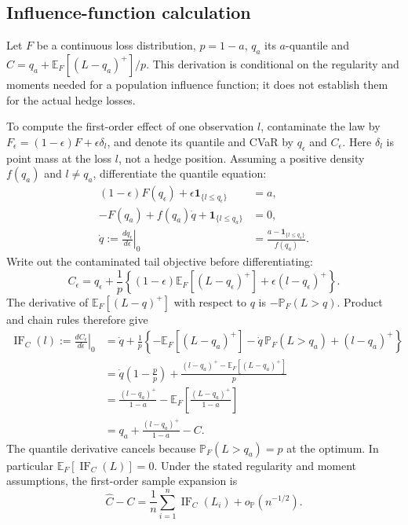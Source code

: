 \documentclass[11pt,a4paper]{article}
\newcommand{\E}{\mathbb E}
\newcommand{\Pp}{\mathbb P}
\newcommand{\ind}{\mathbf 1}
\newcommand{\IF}{\operatorname{IF}}
\theoremstyle{remark}
\begin{document}
\subsection{Influence-function calculation}
Let $F$ be a continuous loss distribution, $p=1-a$, $q_a$ its $a$-quantile and
$C=q_a+\E_F[(L-q_a)^+]/p$. This derivation is conditional on the regularity and moments needed for a population influence function; it does not establish them for the actual hedge losses.

To compute the first-order effect of one observation $l$, contaminate the law by
$F_\epsilon=(1-\epsilon)F+\epsilon\delta_l$, and denote its quantile and CVaR by $q_\epsilon$ and $C_\epsilon$. Here $\delta_l$ is point mass at the loss $l$, not a hedge position. Assuming a positive density $f(q_a)$ and $l\ne q_a$, differentiate the quantile equation:
\begin{align}
 (1-\epsilon)F(q_\epsilon)+\epsilon\ind_{\{l\leq q_\epsilon\}}&=a,\nonumber\\
 -F(q_a)+f(q_a)\dot q+\ind_{\{l\leq q_a\}}&=0,\nonumber\\
 \dot q:=\left.\frac{dq_\epsilon}{d\epsilon}\right|_0
 &=\frac{a-\ind_{\{l\leq q_a\}}}{f(q_a)}.
\end{align}
Write out the contaminated tail objective before differentiating:
\begin{equation}
 C_\epsilon=q_\epsilon+\frac1p\left\{
 (1-\epsilon)\E_F[(L-q_\epsilon)^+]
       +\epsilon(l-q_\epsilon)^+\right\}.
\end{equation}
The derivative of $\E_F[(L-q)^+]$ with respect to $q$ is
$-\Pp_F(L>q)$. Product and chain rules therefore give
\begin{align}
 \IF_C(l):=\left.\frac{dC_\epsilon}{d\epsilon}\right|_0
 &=\dot q+\frac1p\left\{
   -\E_F[(L-q_a)^+]-\dot q\,\Pp_F(L>q_a)
                    +(l-q_a)^+\right\}\nonumber\\
 &=\dot q\left(1-\frac p p\right)
   +\frac{(l-q_a)^+-\E_F[(L-q_a)^+]}p\nonumber\\
 &=\frac{(l-q_a)^+}{1-a}
   -\E_F\!\left[\frac{(L-q_a)^+}{1-a}\right]\nonumber\\
 &=q_a+\frac{(l-q_a)^+}{1-a}-C.
 \label{eq:influence}
\end{align}
The quantile derivative cancels because $\Pp_F(L>q_a)=p$ at the optimum. In particular $\E_F[\IF_C(L)]=0$. Under the stated regularity and moment assumptions, the first-order sample expansion is
\begin{equation}
 \widehat C-C=\frac1n\sum_{i=1}^n\IF_C(L_i)+o_{\Pp}(n^{-1/2}).
\end{equation}
\end{document}
